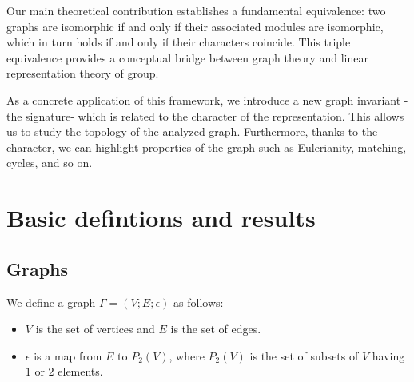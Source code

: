 \documentclass[preprint,12pt,authoryear]{elsarticle}
\theoremstyle{definition}
\begin{document}
Our main theoretical contribution establishes a fundamental equivalence: two graphs are isomorphic if and only if their associated modules are isomorphic, which in turn holds if and only if their characters coincide. This triple equivalence provides  a conceptual bridge between graph theory and linear representation theory of group.

As a concrete application of this framework, we introduce a new graph invariant - the signature- which is related to the character of the representation. This allows us to study the topology of the analyzed graph. Furthermore, thanks to the character, we can highlight properties of the graph such as Eulerianity, matching, cycles, and so on.




\section{Basic defintions and results}

\subsection{Graphs}
 We define a graph $\Gamma=(V; E; \epsilon)$ as follows:
\begin{itemize}
\item $V$ is the set of vertices and $E$ is the set of edges.
\item $\epsilon$ is a map from $E$ to $P_{2}(V)$, where $P_{2}(V)$ is the set of subsets of $V$ having $1$ or $2$ elements.
\end{itemize}
\end{document}
